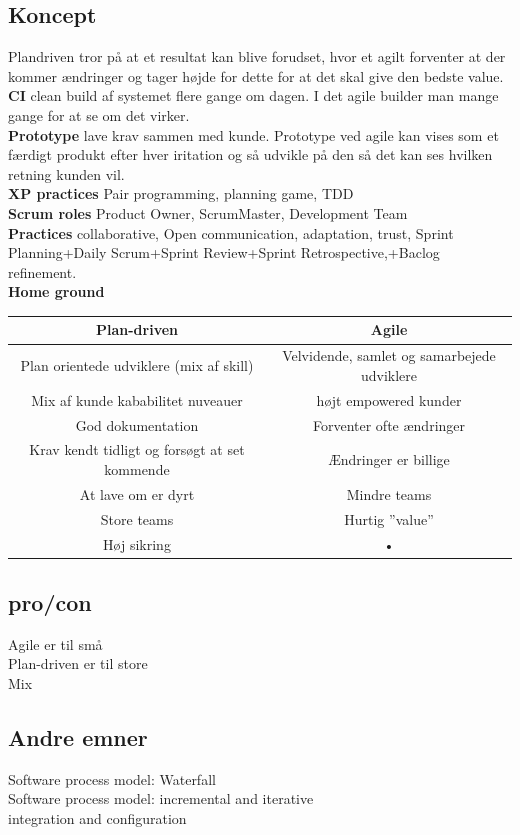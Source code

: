 \documentclass[11pt,a4paper]{article}
\begin{document}
\subsection{Koncept}
Plandriven tror på at et resultat kan blive forudset, hvor et agilt forventer at der kommer ændringer og tager højde for dette for at det skal give den bedste value.\\
\textbf{CI} clean build af systemet flere gange om dagen. I det agile builder man mange gange for at se om det virker.\\
\textbf{Prototype} lave krav sammen med kunde. Prototype ved agile kan vises som et færdigt produkt efter hver iritation og så udvikle på den så det kan ses hvilken retning kunden vil.\\
\textbf{XP practices} Pair programming, planning game, TDD\\
\textbf{Scrum roles} Product Owner, ScrumMaster, Development Team\\
\textbf{Practices} collaborative, Open communication, adaptation, trust, Sprint Planning+Daily Scrum+Sprint Review+Sprint Retrospective,+Baclog refinement.\\
\textbf{Home ground}\\
\begin{tabular}{|c|c|}
\hline 
\textbf{Plan-driven} & \textbf{Agile} \\ 
\hline 
Plan orientede udviklere (mix af skill) & Velvidende, samlet og samarbejede udviklere \\ 
\hline 
Mix af kunde kababilitet nuveauer & højt empowered kunder \\ 
\hline 
God dokumentation & Forventer ofte ændringer \\ 
\hline 
Krav kendt tidligt og forsøgt at set kommende & Ændringer er billige \\ 
\hline 
At lave om er dyrt & Mindre teams \\ 
\hline 
Store teams & Hurtig ”value” \\ 
\hline 
Høj sikring & • \\ 
\hline 
\end{tabular} 


\subsection{pro/con}
Agile er til små\\
Plan-driven er til store\\
Mix
\subsection{Andre emner}
Software process model: Waterfall\\
Software process model: incremental and iterative\\
integration and configuration
\end{document}
